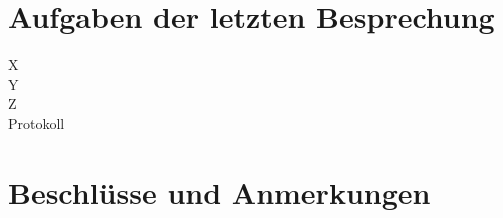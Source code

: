 
\newcommand{\Titel}{3. Protokoll}
\newcommand{\Teilnehmer}{Jonas Bürgel, Patrick Welter, Markus Reischl}
\newcommand{\DatumUndZeit}{21.10.2021 16:00-16:15}
\newcommand{\Ort}{Zoom Meeting}
\newcommand{\Thema}{Fertigstellung Prototyp und Beginn Schreibarbeit}


\section{Aufgaben der letzten Besprechung}
\begin{description}
	\item[X] \hfill {} \fullcheck
	\item[Y] \hfill {} \halfcheck
	\item[Z] \hfill {} \nocheck
	\item[Protokoll] \hfill {} \fullcheck
\end{description}

\section{Beschlüsse und Anmerkungen}


